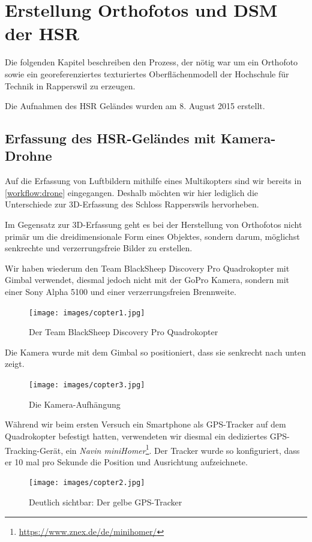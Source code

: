 \chapter{Erstellung Orthofotos und DSM der HSR}


Die folgenden Kapitel beschreiben den Prozess, der nötig war um ein Orthofoto
sowie ein georeferenziertes texturiertes Oberflächenmodell der Hochschule für
Technik in Rapperswil zu erzeugen.

Die Aufnahmen des HSR Geländes wurden am 8. August 2015 erstellt.


\section{Erfassung des HSR-Geländes mit Kamera-Drohne}

\label{workflow:hsr:drone}

Auf die Erfassung von Luftbildern mithilfe eines Multikopters sind wir bereits
in \autoref{workflow:drone} eingegangen. Deshalb möchten wir hier lediglich die
Unterschiede zur 3D-Erfassung des Schloss Rapperswils hervorheben.

Im Gegensatz zur 3D-Erfassung geht es bei der Herstellung von Orthofotos nicht
primär um die dreidimensionale Form eines Objektes, sondern darum, möglichst
senkrechte und verzerrungsfreie Bilder zu erstellen.

Wir haben wiederum den Team BlackSheep Discovery Pro Quadrokopter mit Gimbal
verwendet, diesmal jedoch nicht mit der GoPro Kamera, sondern mit einer Sony
Alpha 5100 und einer verzerrungsfreien Brennweite.
\begin{figure}[H]
	\centering
	\texttt{[image: images/copter1.jpg]}
	\caption{Der Team BlackSheep Discovery Pro Quadrokopter}
	\label{img:copter1}
\end{figure}

\noindent Die Kamera wurde mit dem Gimbal so positioniert, dass sie senkrecht
nach unten zeigt.
\begin{figure}[H]
	\centering
	\texttt{[image: images/copter3.jpg]}
	\caption{Die Kamera-Aufhängung}
	\label{img:copter3}
\end{figure}

\noindent Während wir beim ersten Versuch ein Smartphone als GPS-Tracker auf dem
Quadrokopter befestigt hatten, verwendeten wir diesmal ein dediziertes
GPS-Tracking-Gerät, ein \textit{Navin
miniHomer}\footnote{\url{https://www.znex.de/de/minihomer/}}. Der Tracker wurde
so konfiguriert, dass er 10 mal pro Sekunde die Position und Ausrichtung
aufzeichnete.
\begin{figure}[H]
	\centering
	\texttt{[image: images/copter2.jpg]}
	\caption{Deutlich sichtbar: Der gelbe GPS-Tracker}
	\label{img:copter2}
\end{figure}

